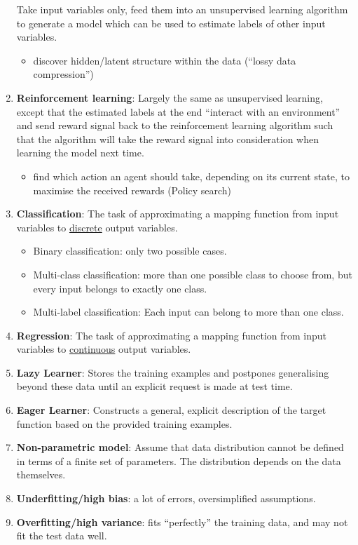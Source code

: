 \documentclass[twocolumn,landscape,10pt]{article}
\theoremstyle{definition}
\begin{document}
\begin{enumerate}
        Take input variables only, feed them into an unsupervised learning
        algorithm to generate a model which can be used to estimate labels of
        other input variables.
        \begin{itemize}
            \item discover hidden/latent structure within the data (``lossy data
                compression'')
        \end{itemize} 
    \item \textbf{Reinforcement learning}:
        Largely the same as unsupervised learning, except that
        the estimated labels at the end ``interact with an
        environment'' and send reward signal back to the reinforcement learning
        algorithm such that the algorithm will take the reward signal into
        consideration when learning the model next time.
        \begin{itemize}
            \item find which action an agent should take, depending on 
                its current state, to maximise the received rewards (Policy
                search)
        \end{itemize} 
    \item \textbf{Classification}:
        The task of approximating a mapping function from input variables to
        \underline{discrete} output variables.
        \begin{itemize}
            \item Binary classification: only two possible cases.
            \item Multi-class classification: more than one possible class to
                choose from, but every input belongs to exactly one class.
            \item Multi-label classification: Each input can belong to more than
                one class.
        \end{itemize} 
    \item \textbf{Regression}:
        The task of approximating a mapping function from input variables to
        \underline{continuous} output variables.
    \item \textbf{Lazy Learner}:
        Stores the training examples and postpones generalising beyond these
        data until an explicit request is made at test time.
    \item \textbf{Eager Learner}:
        Constructs a general, explicit description of the target function based
        on the provided training examples.
    \item \textbf{Non-parametric model}: Assume that data distribution cannot be
        defined in terms of a finite set of parameters.
        The distribution depends on the data themselves.
    \item \textbf{Underfitting/high bias}: a lot of errors, oversimplified
        assumptions.
    \item \textbf{Overfitting/high variance}: fits ``perfectly'' the training
        data, and may not fit the test data well.
\end{enumerate} 
\end{document}
